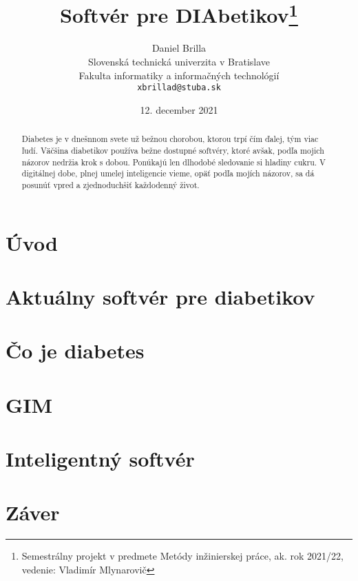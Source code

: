 \documentclass[10pt,slovak,a4paper]{article}
\title{Softvér pre DIAbetikov\thanks{Semestrálny projekt v predmete Metódy inžinierskej práce, ak. rok 2021/22, vedenie: Vladimír Mlynarovič}}
\author{Daniel Brilla\\[2pt]
	{\small Slovenská technická univerzita v Bratislave}\\
	{\small Fakulta informatiky a informačných technológií}\\
	{\small \texttt{xbrillad@stuba.sk}}
	}
\date{\small 12. december 2021}
\begin{document}
\maketitle

\begin{abstract}
Diabetes je v dnešnnom svete už bežnou chorobou, ktorou trpí čím ďalej, tým viac ľudí. Väčšina diabetikov používa bežne dostupné softvéry, ktoré avšak, podľa mojich názorov nedržia krok s dobou. Ponúkajú len dlhodobé sledovanie si hladiny cukru. V digitálnej dobe, plnej umelej inteligencie vieme, opäť podľa mojích názorov, sa dá posunúť vpred a zjednoduchšiť každodenný život. 
\end{abstract}



\section{Úvod}



\section{Aktuálny softvér pre diabetikov}



\section{Čo je diabetes} \label{diabetes}



\section{GIM} \label{GIM}



\section{Inteligentný softvér} \label{int-soft}




\section{Záver} \label{zaver}





\newpage
	
\end{document}
